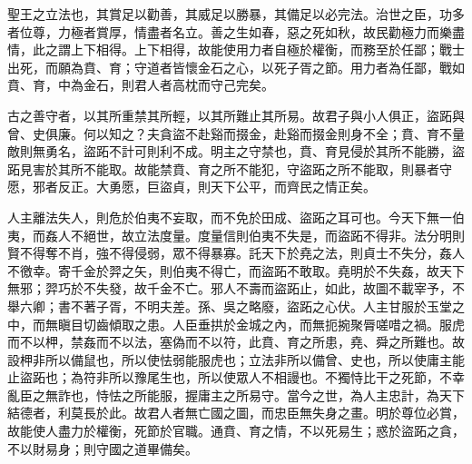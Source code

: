 
\begin{pinyinscope}
聖王之立法也，其賞足以勸善，其威足以勝暴，其備足以必完法。治世之臣，功多者位尊，力極者賞厚，情盡者名立。善之生如春，惡之死如秋，故民勸極力而樂盡情，此之謂上下相得。上下相得，故能使用力者自極於權衡，而務至於任鄙；戰士出死，而願為賁、育；守道者皆懷金石之心，以死子胥之節。用力者為任鄙，戰如賁、育，中為金石，則君人者高枕而守己完矣。

古之善守者，以其所重禁其所輕，以其所難止其所易。故君子與小人俱正，盜跖與曾、史俱廉。何以知之？夫貪盜不赴谿而掇金，赴谿而掇金則身不全；賁、育不量敵則無勇名，盜跖不計可則利不成。明主之守禁也，賁、育見侵於其所不能勝，盜跖見害於其所不能取。故能禁賁、育之所不能犯，守盜跖之所不能取，則暴者守愿，邪者反正。大勇愿，巨盜貞，則天下公平，而齊民之情正矣。

人主離法失人，則危於伯夷不妄取，而不免於田成、盜跖之耳可也。今天下無一伯夷，而姦人不絕世，故立法度量。度量信則伯夷不失是，而盜跖不得非。法分明則賢不得奪不肖，強不得侵弱，眾不得暴寡。託天下於堯之法，則貞士不失分，姦人不徼幸。寄千金於羿之矢，則伯夷不得亡，而盜跖不敢取。堯明於不失姦，故天下無邪；羿巧於不失發，故千金不亡。邪人不壽而盜跖止，如此，故圖不載宰予，不舉六卿；書不著子胥，不明夫差。孫、吳之略廢，盜跖之心伏。人主甘服於玉堂之中，而無瞋目切齒傾取之患。人臣垂拱於金城之內，而無扼捥聚脣嗟唶之禍。服虎而不以柙，禁姦而不以法，塞偽而不以符，此賁、育之所患，堯、舜之所難也。故設柙非所以備鼠也，所以使怯弱能服虎也；立法非所以備曾、史也，所以使庸主能止盜跖也；為符非所以豫尾生也，所以使眾人不相謾也。不獨恃比干之死節，不幸亂臣之無詐也，恃怯之所能服，握庸主之所易守。當今之世，為人主忠計，為天下結德者，利莫長於此。故君人者無亡國之圖，而忠臣無失身之畫。明於尊位必賞，故能使人盡力於權衡，死節於官職。通賁、育之情，不以死易生；惑於盜跖之貪，不以財易身；則守國之道畢備矣。


\end{pinyinscope}